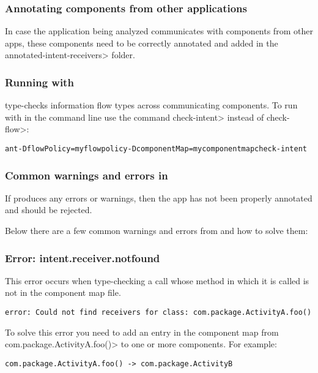 \subsubsection{Annotating components from other applications}
In case the application being analyzed communicates with components from
other apps, these components need to be correctly annotated and added in the 
\<annotated-intent-receivers> folder.

\subsubsection{Running \theIntentChecker{} with \theFlowChecker{}}

\TheIntentChecker{} type-checks information flow types across communicating
components. To run \theIntentChecker{} with \theFlowChecker{} in the command
line use the command \<check-intent> instead of \<check-flow>:

\begin{alltt}
ant -DflowPolicy=myflowpolicy -DcomponentMap=mycomponentmap check-intent
\end{alltt}

\subsubsection{Common warnings and errors in \theIntentChecker{}}

If \theIntentChecker{} produces any errors or warnings, then the app
has not been properly annotated and should be rejected.

Below there are a few common warnings and errors from \theIntentChecker and
how to solve them:
\subsubsection{Error: intent.receiver.notfound}

This error occurs when type-checking a \sendIntent{} call whose method in which
it is called is not in the component map file.

\begin{Verbatim}
error: Could not find receivers for class: com.package.ActivityA.foo()
\end{Verbatim}

To solve this error you need to add an entry in the component map from 
\<com.package.ActivityA.foo()> to one or more components. For example:

\begin{Verbatim}
com.package.ActivityA.foo() -> com.package.ActivityB
\end{Verbatim}


